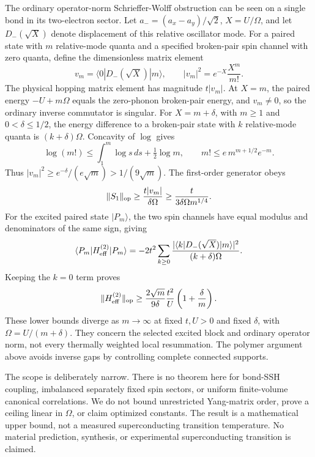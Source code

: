 \documentclass[11pt]{article}
\begin{document}
The ordinary operator-norm Schrieffer-Wolff obstruction can be seen on a single bond in its two-electron sector. Let $a_-=(a_x-a_y)/\sqrt2$, $X=U/\Omega$, and let $D_-(\sqrt X)$ denote displacement of this relative oscillator mode. For a paired state with $m$ relative-mode quanta and a specified broken-pair spin channel with zero quanta, define the dimensionless matrix element
\[
 v_m=\langle0|D_-(\sqrt X)|m\rangle,\qquad
 |v_m|^2=e^{-X}\frac{X^m}{m!}.
\]
The physical hopping matrix element has magnitude $t|v_m|$. At $X=m$, the paired energy $-U+m\Omega$ equals the zero-phonon broken-pair energy, and $v_m\ne0$, so the ordinary inverse commutator is singular. For $X=m+\delta$, with $m\ge1$ and $0<\delta\le1/2$, the energy difference to a broken-pair state with $k$ relative-mode quanta is $(k+\delta)\Omega$. Concavity of $\log$ gives
\[
 \log(m!)\le\int_1^m\log s\,ds+\tfrac12\log m,
 \qquad m!\le e\,m^{m+1/2}e^{-m}.
\]
Thus $|v_m|^2\ge e^{-\delta}/(e\sqrt m)>1/(9\sqrt m)$. The first-order generator obeys
\[
 \|S_1\|_{\rm op}\ge\frac{t|v_m|}{\delta\Omega}
 \ge\frac{t}{3\delta\Omega m^{1/4}}.
\]
For the excited paired state $|P_m\rangle$, the two spin channels have equal modulus and denominators of the same sign, giving
\[
 \langle P_m|H_{\rm eff}^{(2)}|P_m\rangle
 =-2t^2\sum_{k\ge0}
 \frac{|\langle k|D_-(\sqrt X)|m\rangle|^2}{(k+\delta)\Omega}.
\]
Keeping the $k=0$ term proves
\[
 \|H_{\rm eff}^{(2)}\|_{\rm op}
 \ge\frac{2\sqrt m}{9\delta}\frac{t^2}{U}
       \left(1+\frac{\delta}{m}\right).
\]
These lower bounds diverge as $m\to\infty$ at fixed $t,U>0$ and fixed $\delta$, with $\Omega=U/(m+\delta)$. They concern the selected excited block and ordinary operator norm, not every thermally weighted local resummation. The polymer argument above avoids inverse gaps by controlling complete connected supports.

The scope is deliberately narrow. There is no theorem here for bond-SSH coupling, imbalanced separately fixed spin sectors, or uniform finite-volume canonical correlations. We do not bound unrestricted Yang-matrix order, prove a ceiling linear in $\Omega$, or claim optimized constants. The result is a mathematical upper bound, not a measured superconducting transition temperature. No material prediction, synthesis, or experimental superconducting transition is claimed.
\end{document}
